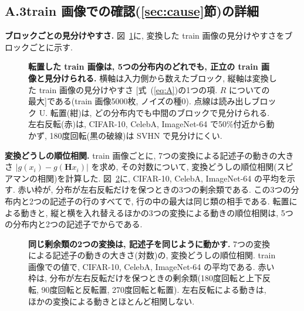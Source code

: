\documentclass[MIRU,submit]{miru2025j}
\newcommand{\Hm}{\mathbf{H}}            %
\renewcommand{\eqref}[1]{(\ref{#1})}
\begin{document}
\subsection*{A.3\quad train 画像での確認(\ref{sec:cause}節)の詳細}
\label{sec:supp-check}
\textbf{ブロックごとの見分けやすさ.} 図~\ref{fig:blk}に, 変換した train 画像の見分けやすさをブロックごとに示す.
\begin{figure}[H]\centering

\caption{\textbf{転置した train 画像は, 5つの分布内のどれでも, 正立の train 画像と見分けられる.} 横軸は入力側から数えたブロック, 縦軸は変換した train 画像の見分けやすさ [式~\eqref{eq:A}の1つの項. $R$ についての最大]である(train 画像5000枚, ノイズの種0). 点線は読み出しブロック U. 転置(紺)は, どの分布内でも中間のブロックで見分けられる. 左右反転(赤)は, CIFAR-10, CelebA, ImageNet-64 で50\%付近から動かず, 180度回転(黒の破線)は SVHN で見分けにくい.}
\label{fig:blk}
\end{figure}

\textbf{変換どうしの順位相関.} train 画像ごとに, 7つの変換による記述子の動きの大きさ $|g(x_i)-g(\Hm x_i)|$ を求め, その対数について, 変換どうしの順位相関(スピアマンの相関)を計算した. 図~\ref{fig:rho}に, CIFAR-10, CelebA, ImageNet-64 の平均を示す. 赤い枠が, 分布が左右反転だけを保つときの3つの剰余類である. この3つの分布内と2つの記述子の\nRhoRows{}行のすべてで, 行の中の最大は同じ類の相手である. 転置による動きと, 縦と横を入れ替えるほかの3つの変換による動きの順位相関は, 5つの分布内と2つの記述子で\nSwapRhoMin{}から\nSwapRhoMax{}である.
\begin{figure}[H]\centering

\caption{\textbf{同じ剰余類の2つの変換は, 記述子を同じように動かす.} 7つの変換による記述子の動きの大きさ(対数)の, 変換どうしの順位相関. train 画像での値で, CIFAR-10, CelebA, ImageNet-64 の平均である. 赤い枠は, 分布が左右反転だけを保つときの剰余類(180度回転と上下反転, 90度回転と反転置, 270度回転と転置). 左右反転による動きは, ほかの変換による動きとほとんど相関しない.}
\label{fig:rho}
\end{figure}
\end{document}
